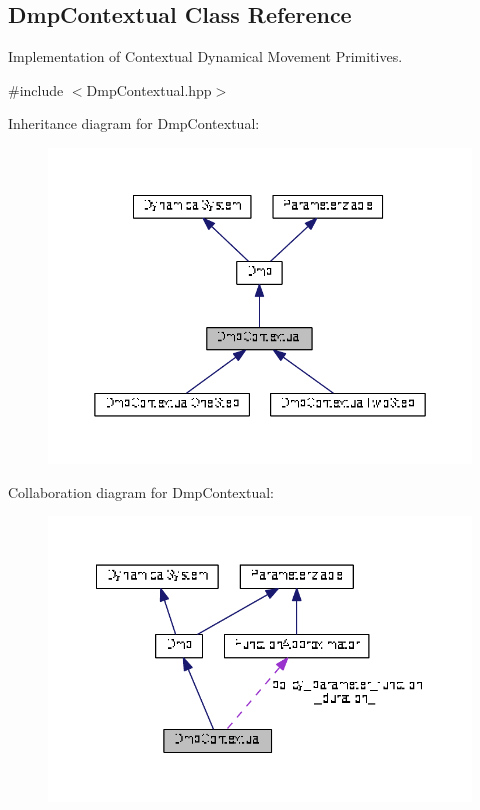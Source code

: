 \hypertarget{classDmpBbo_1_1DmpContextual}{\subsection{Dmp\+Contextual Class Reference}
\label{classDmpBbo_1_1DmpContextual}
}


Implementation of Contextual Dynamical Movement Primitives.  




{\ttfamily \#include $<$Dmp\+Contextual.\+hpp$>$}



Inheritance diagram for Dmp\+Contextual\+:
\nopagebreak
\begin{figure}[H]
\begin{center}
\leavevmode
\includegraphics[width=350pt]{classDmpBbo_1_1DmpContextual__inherit__graph}
\end{center}
\end{figure}


Collaboration diagram for Dmp\+Contextual\+:
\nopagebreak
\begin{figure}[H]
\begin{center}
\leavevmode
\includegraphics[width=349pt]{classDmpBbo_1_1DmpContextual__coll__graph}
\end{center}
\end{figure}
